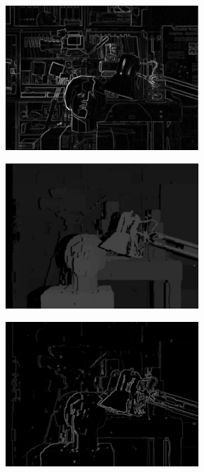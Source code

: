 \begin{figure}[h!]
\begin{subfigure}[]{0.4\textwidth}
\caption{\label{fig:wr}}
\end{subfigure}
\begin{subfigure}[]{0.4\textwidth}
\centering
\includegraphics[width=0.8\textwidth]{./img/right_sobel.jpg}
\caption{\label{fig:rws}}
\end{subfigure}
\begin{subfigure}[]{0.4\textwidth}
\centering
\includegraphics[width=0.8\textwidth]{./img/ldisp.jpg}
\caption{\label{fig:ld}}
\end{subfigure}
\begin{subfigure}[]{0.4\textwidth}
\centering
\includegraphics[width=0.8\textwidth]{./img/ldisp_sobel.jpg}

\end{subfigure}
\end{figure}
